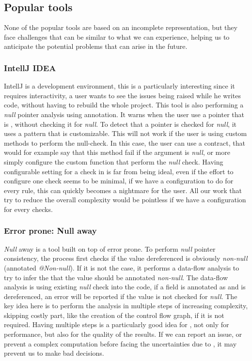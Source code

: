 \subsection{Popular tools}
\label{subsec:other_tools_features}

None of the popular tools are based on an incomplete representation, but they face challenges that can be similar to what we can experience, helping us to anticipate the potential problems that can arise in the future.

\subsubsection{IntellJ IDEA}
\label{subsubsec:intellj_idea}

IntellJ is a development environment, this is a particularly interesting since it requires interactivity, a user wants to see the issues being raised while he writes code, without having to rebuild the whole project. 
This tool is also performing a \emph{null} pointer analysis using annotation. 
It warns when the user use a pointer that is \nullable{}, without checking it for \emph{null}. 
To detect that a pointer is checked for \emph{null}, it uses a pattern that is customizable. 
This will not work if the user is using custom methods to perform the null-check. 
In this case, the user can use a contract, that would for example say that this method fail if the argument is \emph{null}, or more simply configure the custom function that perform the \emph{null} check.\newline
Having configurable setting for a check in \slang{} is far from being ideal, even if the effort to configure one check seems to be minimal, if we have a configuration to do for every rule, this can quickly becomes a nightmare for the user. 
All our work that try to reduce the overall complexity would be pointless if we have a configuration for every checks.


\subsubsection{Error prone: Null away}
\label{subsubsec:error_prone}

\emph{Null} away is a tool built on top of error prone. 
To perform \emph{null} pointer consistency, the process first checks if the value dereferenced is obviously \emph{non-null} (annotated \emph{@Non-null}). 
If it is not the case, it performs a data-flow analysis to try to infer the that the value should be annotated \emph{non-null}. 
The data-flow analysis is using existing \emph{null} check into the code, if a field is annotated as \nullable{} and is dereferenced, an error will be reported if the value is not checked for \emph{null}. \newline
The key idea here is to perform the analysis in multiple steps of increasing complexity, skipping costly part, like the creation of the control flow graph, if it is not required.
Having multiple steps is a particularly good idea for \slang{}, not only for performance, but also for the quality of the results. 
If we can report an issue, or prevent a complex computation before facing the uncertainties due to \slang{}, it may prevent us to make bad decisions.

